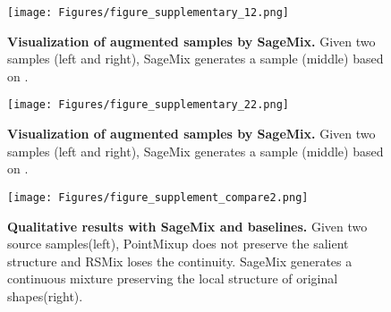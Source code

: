 \documentclass{article}
\begin{document}
\begin{figure}[t]
\centering
\texttt{[image: Figures/figure\_supplementary\_12.png]}
\caption{\textbf{Visualization of augmented samples by SageMix.} Given two samples (left and right), SageMix generates a sample (middle) based on .}



\label{fig:figure_supplementary1}
\end{figure} \begin{figure}[t]
\centering
\texttt{[image: Figures/figure\_supplementary\_22.png]}
\caption{\textbf{Visualization of augmented samples by SageMix.} Given two samples (left and right), SageMix generates a sample (middle) based on .}



\label{fig:figure_supplementary2}
\end{figure} \begin{figure}[t]
\centering
\texttt{[image: Figures/figure\_supplement\_compare2.png]}
\caption{\textbf{Qualitative results with SageMix and baselines.} Given two source samples(left), PointMixup does not preserve the salient structure and RSMix loses the continuity. SageMix generates a continuous mixture preserving the local structure of original shapes(right).}


\label{fig:figure_supplementarycompare}
\end{figure} 

 
\end{document}
